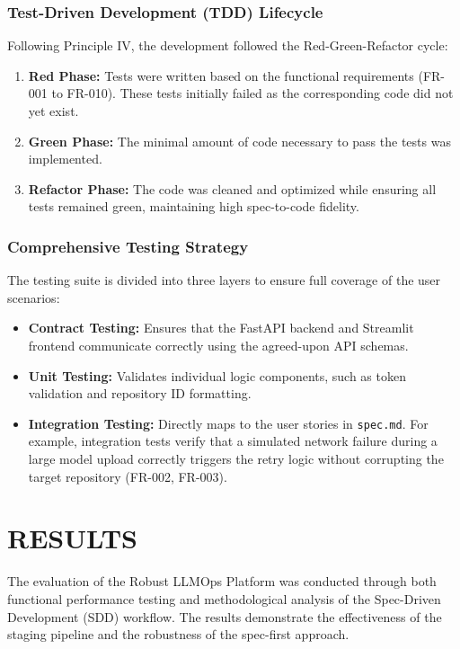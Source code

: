 \documentclass[a4paper,12pt]{report}
\begin{document}
\subsection{Test-Driven Development (TDD) Lifecycle}
Following Principle IV, the development followed the Red-Green-Refactor cycle:
\begin{enumerate}
    \item \textbf{Red Phase:} Tests were written based on the functional requirements (FR-001 to FR-010). These tests initially failed as the corresponding code did not yet exist.
    \item \textbf{Green Phase:} The minimal amount of code necessary to pass the tests was implemented.
    \item \textbf{Refactor Phase:} The code was cleaned and optimized while ensuring all tests remained green, maintaining high spec-to-code fidelity.
\end{enumerate}

\subsection{Comprehensive Testing Strategy}
The testing suite is divided into three layers to ensure full coverage of the user scenarios:
\begin{itemize}
    \item \textbf{Contract Testing:} Ensures that the FastAPI backend and Streamlit frontend communicate correctly using the agreed-upon API schemas.
    \item \textbf{Unit Testing:} Validates individual logic components, such as token validation and repository ID formatting.
    \item \textbf{Integration Testing:} Directly maps to the user stories in \texttt{spec.md}. For example, integration tests verify that a simulated network failure during a large model upload correctly triggers the retry logic without corrupting the target repository (FR-002, FR-003).
\end{itemize}

\chapter{RESULTS}
The evaluation of the Robust LLMOps Platform was conducted through both functional performance testing and methodological analysis of the Spec-Driven Development (SDD) workflow. The results demonstrate the effectiveness of the staging pipeline and the robustness of the spec-first approach.
\end{document}
